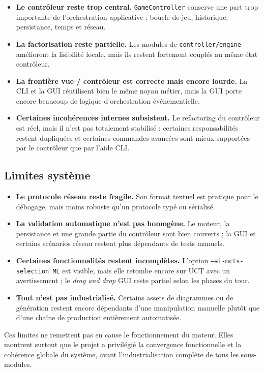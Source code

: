 \documentclass[a4paper]{article}
\begin{document}
\begin{itemize}
    \item \textbf{Le contrôleur reste trop central.} \texttt{GameController} conserve une part trop importante de l'orchestration applicative : boucle de jeu, historique, persistance, temps et réseau.
    \item \textbf{La factorisation reste partielle.} Les modules de \texttt{controller/engine} améliorent la lisibilité locale, mais ils restent fortement couplés au même état contrôleur.
    \item \textbf{La frontière vue / contrôleur est correcte mais encore lourde.} La CLI et la GUI réutilisent bien le même noyau métier, mais la GUI porte encore beaucoup de logique d'orchestration événementielle.
    \item \textbf{Certaines incohérences internes subsistent.} Le refactoring du contrôleur est réel, mais il n'est pas totalement stabilisé : certaines responsabilités restent dupliquées et certaines commandes avancées sont mieux supportées par le contrôleur que par l'aide CLI.
\end{itemize}

\subsection{Limites système}

\begin{itemize}
    \item \textbf{Le protocole réseau reste fragile.} Son format textuel est pratique pour le débogage, mais moins robuste qu'un protocole typé ou sérialisé.
    \item \textbf{La validation automatique n'est pas homogène.} Le moteur, la persistance et une grande partie du contrôleur sont bien couverts ; la GUI et certains scénarios réseau restent plus dépendants de tests manuels.
    \item \textbf{Certaines fonctionnalités restent incomplètes.} L'option \texttt{--ai-mcts-selection ML} est visible, mais elle retombe encore sur UCT avec un avertissement ; le \emph{drag and drop} GUI reste partiel selon les phases du tour.
    \item \textbf{Tout n'est pas industrialisé.} Certains assets de diagrammes ou de génération restent encore dépendants d'une manipulation manuelle plutôt que d'une chaîne de production entièrement automatisée.
\end{itemize}

Ces limites ne remettent pas en cause le fonctionnement du moteur. Elles montrent surtout que le projet a privilégié la convergence fonctionnelle et la cohérence globale du système, avant l'industrialisation complète de tous les sous-modules.
\end{document}
